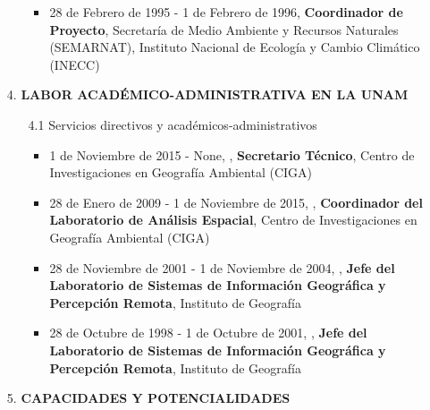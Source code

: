 \documentclass[12pt]{report}
\begin{document}
\begin{enumerate}
\begin{enumerate}
\begin{itemize}
                                    \item{ 28 de Febrero de 1995 - 1 de Febrero de 1996,\textbf{ Coordinador de Proyecto}, Secretaría de Medio Ambiente y Recursos Naturales (SEMARNAT), Instituto Nacional de Ecología y Cambio Climático (INECC) }

                            \end{itemize}

                \end{enumerate}


            \vspace{.5cm}
            \item[4.] \textbf{LABOR ACADÉMICO-ADMINISTRATIVA EN LA UNAM}
                \begin{enumerate}

                        \item[4.1] Servicios directivos y académicos-administrativos
                            \begin{itemize}

                                    \item{ 1 de Noviembre de 2015 - None, ,\textbf{ Secretario Técnico}, Centro de Investigaciones en Geografía Ambiental (CIGA) }

                                    \item{ 28 de Enero de 2009 - 1 de Noviembre de 2015, ,\textbf{ Coordinador del Laboratorio de Análisis Espacial}, Centro de Investigaciones en Geografía Ambiental (CIGA) }

                                    \item{ 28 de Noviembre de 2001 - 1 de Noviembre de 2004, ,\textbf{ Jefe del Laboratorio de Sistemas de Información Geográfica y Percepción Remota}, Instituto de Geografía }

                                    \item{ 28 de Octubre de 1998 - 1 de Octubre de 2001, ,\textbf{ Jefe del Laboratorio de Sistemas de Información Geográfica y Percepción Remota}, Instituto de Geografía }

                            \end{itemize}


                \end{enumerate}




                \vspace{0.5cm}
                \item[5.] \textbf{CAPACIDADES Y POTENCIALIDADES}
                    \begin{itemize}


\end{itemize}
\end{enumerate}
\end{document}
